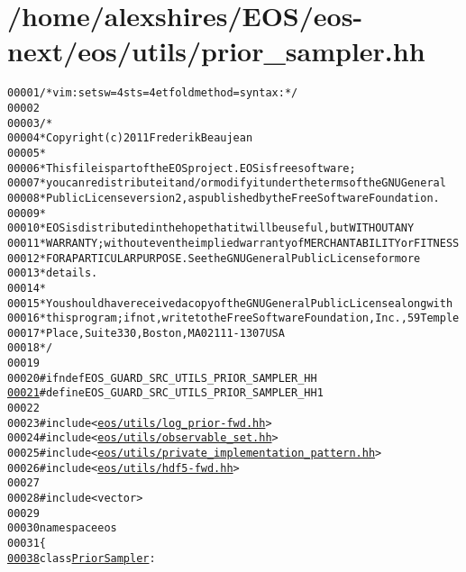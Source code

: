 \hypertarget{prior__sampler_8hh_source}{
\section{/home/alexshires/EOS/eos-\/next/eos/utils/prior\_\-sampler.hh}
}


\begin{footnotesize}\begin{alltt}
00001 \textcolor{comment}{/* vim: set sw=4 sts=4 et foldmethod=syntax : */}
00002 
00003 \textcolor{comment}{/*}
00004 \textcolor{comment}{ * Copyright (c) 2011 Frederik Beaujean}
00005 \textcolor{comment}{ *}
00006 \textcolor{comment}{ * This file is part of the EOS project. EOS is free software;}
00007 \textcolor{comment}{ * you can redistribute it and/or modify it under the terms of the GNU General}
00008 \textcolor{comment}{ * Public License version 2, as published by the Free Software Foundation.}
00009 \textcolor{comment}{ *}
00010 \textcolor{comment}{ * EOS is distributed in the hope that it will be useful, but WITHOUT ANY}
00011 \textcolor{comment}{ * WARRANTY; without even the implied warranty of MERCHANTABILITY or FITNESS}
00012 \textcolor{comment}{ * FOR A PARTICULAR PURPOSE.  See the GNU General Public License for more}
00013 \textcolor{comment}{ * details.}
00014 \textcolor{comment}{ *}
00015 \textcolor{comment}{ * You should have received a copy of the GNU General Public License along with}
00016 \textcolor{comment}{ * this program; if not, write to the Free Software Foundation, Inc., 59 Temple}
00017 \textcolor{comment}{ * Place, Suite 330, Boston, MA  02111-1307  USA}
00018 \textcolor{comment}{ */}
00019 
00020 \textcolor{preprocessor}{#ifndef EOS\_GUARD\_SRC\_UTILS\_PRIOR\_SAMPLER\_HH}
\hypertarget{prior__sampler_8hh_source_l00021}{}\hyperlink{prior__sampler_8hh_a4e897fbdc7ba64f124d5578a4bf894c9}{00021} \textcolor{preprocessor}{}\textcolor{preprocessor}{#define EOS\_GUARD\_SRC\_UTILS\_PRIOR\_SAMPLER\_HH 1}
00022 \textcolor{preprocessor}{}
00023 \textcolor{preprocessor}{#include <\hyperlink{log__prior-fwd_8hh}{eos/utils/log_prior-fwd.hh}>}
00024 \textcolor{preprocessor}{#include <\hyperlink{observable__set_8hh}{eos/utils/observable_set.hh}>}
00025 \textcolor{preprocessor}{#include <\hyperlink{private__implementation__pattern_8hh}{eos/utils/private_implementation_pattern.hh}>}
00026 \textcolor{preprocessor}{#include <\hyperlink{hdf5-fwd_8hh}{eos/utils/hdf5-fwd.hh}>}
00027 
00028 \textcolor{preprocessor}{#include <vector>}
00029 
00030 \textcolor{keyword}{namespace }eos
00031 \{
\hypertarget{prior__sampler_8hh_source_l00038}{}\hyperlink{classeos_1_1PriorSampler}{00038}     \textcolor{keyword}{class }\hyperlink{classeos_1_1PriorSampler}{PriorSampler} :

\end{alltt}
\end{footnotesize}
